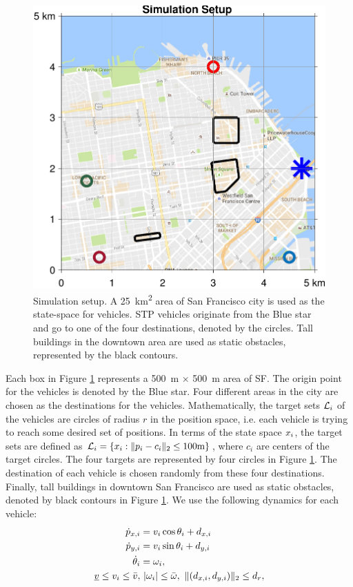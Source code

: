 \begin{figure}
  \centering
  \includegraphics[width=0.8\columnwidth]{"figs/sf_setup"}
  \caption{Simulation setup. A \SI{25}{\km\squared} area of San Francisco city is used as the state-space for vehicles. STP vehicles originate from the Blue star and go to one of the four destinations, denoted by the circles. Tall buildings in the downtown area are used as static obstacles, represented by the black contours.}
  \label{fig:sf_setup}
\end{figure}
Each box in Figure \ref{fig:sf_setup} represents a \SI{500}{\m} $\times$ \SI{500}{\m} area of SF. The origin point for the vehicles is denoted by the Blue star. Four different areas in the city are chosen as the destinations for the vehicles. Mathematically, the target sets $\mathcal{L}_i$ of the vehicles are circles of radius $r$ in the position space, i.e. each vehicle is trying to reach some desired set of positions. In terms of the state space $x_i$, the target sets are defined as $\mathcal{L}_i = \{x_i: \|p_i - c_i\|_2 \le 100 \text{m}\}$, where $c_i$ are centers of the target circles. The four targets are represented by four circles in Figure \ref{fig:sf_setup}. The destination of each vehicle is chosen randomly from these four destinations. Finally, tall buildings in downtown San Francisco are used as static obstacles, denoted by black contours in Figure \ref{fig:sf_setup}. We use the following dynamics for each vehicle:
\begin{equation}
\label{eq:dyn_i}
\begin{aligned}
\dot{\pos}_{x,i} &= v_i \cos \theta_i + d_{x,i} \\
\dot{\pos}_{y,i} &= v_i \sin \theta_i + d_{y,i}\\
\dot{\theta}_i &= \omega_i, \\
\underline{v} \le v_i \le \bar{v}, & ~|\omega_i| \le \bar{\omega}, ~\|(d_{x,i}, d_{y,i}) \|_2 \le d_{r},
\end{aligned}
\end{equation}
